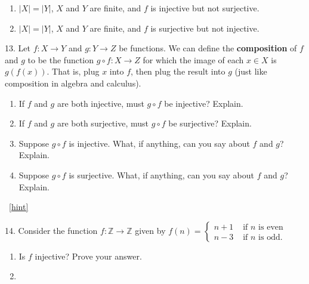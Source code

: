 \documentclass[10pt,]{book}
\newcommand{\terminology}[1]{\textbf{#1}}
\theoremstyle{plain}
\theoremstyle{definition}
\theoremstyle{definition}
\theoremstyle{definition}
\numberwithin{equation}{chapter}
\def\Z{\mathbb Z}
\newcommand{\amp}{&}
\begin{document}
\begin{exerciselist}
\begin{enumerate}[label=(\alph*)]
\item\hypertarget{li-454}{}\(|X| = |Y|\), \(X\) and \(Y\) are finite, and \(f\) is injective but not surjective.%
\item\hypertarget{li-455}{}\(|X| = |Y|\), \(X\) and \(Y\) are finite, and \(f\) is surjective but not injective.%
\end{enumerate}
%
\par\smallskip
\item[13.]\hypertarget{exercise-94}{}\hypertarget{p-2327}{}%
Let \(f:X \to Y\) and \(g:Y \to Z\) be functions.  We can define the \terminology{composition} of \(f\) and \(g\) to be the function \(g\circ f:X \to Z\) for which the image of each \(x \in X\) is \(g(f(x))\).  That is, plug \(x\) into \(f\), then plug the result into \(g\) (just like composition in algebra and calculus).%
\par
\hypertarget{p-2328}{}%
\leavevmode%
\begin{enumerate}[label=(\alph*)]
\item\hypertarget{li-462}{}\hypertarget{p-2329}{}%
If \(f\) and \(g\) are both injective, must \(g\circ f\) be injective?  Explain.%
\item\hypertarget{li-463}{}\hypertarget{p-2330}{}%
If \(f\) and \(g\) are both surjective, must \(g\circ f\) be surjective?  Explain.%
\item\hypertarget{li-464}{}\hypertarget{p-2331}{}%
Suppose \(g\circ f\) is injective.  What, if anything, can you say about \(f\) and \(g\)?  Explain.%
\item\hypertarget{li-465}{}\hypertarget{p-2332}{}%
Suppose \(g\circ f\) is surjective.  What, if anything, can you say about \(f\) and \(g\)?  Explain.%
\end{enumerate}
%
\par\smallskip
~\hfill{\tiny\hyperlink{a-B.3.13}{[hint]}\hypertarget{q-B.3.13}{}}\item[14.]\hypertarget{exercise-95}{}\hypertarget{p-2339}{}%
Consider the function \(f:\Z \to \Z\) given by \(f(n) = \begin{cases}n+1 \amp  \text{ if }n\text{ is even} \\ n-3 \amp \text{ if }n\text{ is odd} . \end{cases}\) \leavevmode%
\begin{enumerate}[label=(\alph*)]
\item\hypertarget{li-470}{}\hypertarget{p-2340}{}%
Is \(f\) injective? Prove your answer.%
\item\hypertarget{li-471}{}\hypertarget{p-2341}{}%

\end{enumerate}
\end{exerciselist}
\end{document}
